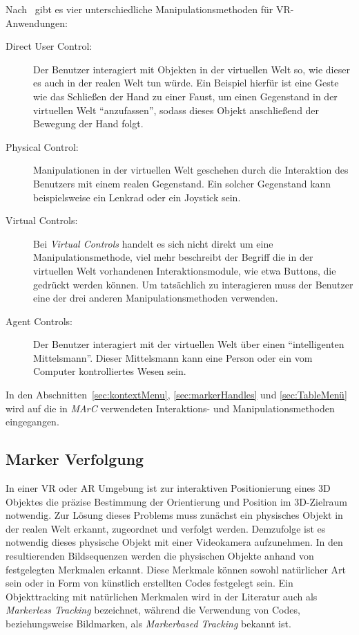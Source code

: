 Nach~\cite{sherman2002understanding} gibt es vier unterschiedliche Manipulationsmethoden für VR-An\-wen\-dung\-en:
\begin{description}
	\item[Direct User Control:] Der Benutzer interagiert mit Objekten in der virtuellen Welt so, wie dieser es auch in der realen Welt tun würde. Ein Beispiel hierfür ist eine Geste wie das Schließen der Hand zu einer Faust, um einen Gegenstand in der virtuellen Welt "`anzufassen"', sodass dieses Objekt anschließend der Bewegung der Hand folgt.
	\item[Physical Control:] Manipulationen in der virtuellen Welt geschehen durch die Interaktion des Benutzers mit einem realen Gegenstand. Ein solcher Gegenstand kann beispielsweise ein Lenkrad oder ein Joystick sein.
	\item[Virtual Controls:] Bei \emph{Virtual Controls} handelt es sich nicht direkt um eine Manipulationsmethode, viel mehr beschreibt der Begriff die in der virtuellen Welt vorhandenen Interaktionsmodule, wie etwa Buttons, die gedrückt werden können. Um tatsächlich zu interagieren muss der Benutzer eine der drei anderen Manipulationsmethoden verwenden.
	\item[Agent Controls:] Der Benutzer interagiert mit der virtuellen Welt über einen "`intelligenten Mittelsmann"'. Dieser Mittelsmann kann eine Person oder ein vom Computer kontrolliertes Wesen sein.
\end{description}
In den Abschnitten~\ref{sec:kontextMenu}, \ref{sec:markerHandles} und \ref{sec:TableMenü} wird auf die in \emph{MArC} verwendeten Interaktions- und Manipulationsmethoden eingegangen.

\subsection{Marker Verfolgung} \label{sec:MarkerTracking}
In einer VR oder AR Umgebung ist zur interaktiven Positionierung eines 3D Objektes die präzise Bestimmung der Orientierung und Position im 3D-Zielraum notwendig. Zur Lösung dieses Problems muss zunächst ein physisches Objekt in der realen Welt erkannt, zugeordnet und verfolgt werden. Demzufolge ist es notwendig dieses physische Objekt mit einer Videokamera aufzunehmen. In den resultierenden Bildsequenzen werden die physischen Objekte anhand von festgelegten Merkmalen erkannt. Diese Merkmale können sowohl natürlicher Art sein oder in Form von künstlich erstellten Codes festgelegt sein. Ein Objekttracking mit natürlichen Merkmalen wird in der Literatur auch als \textit{Markerless Tracking} bezeichnet, während die Verwendung von Codes, beziehungsweise Bildmarken, als \textit{Markerbased Tracking} bekannt ist.

